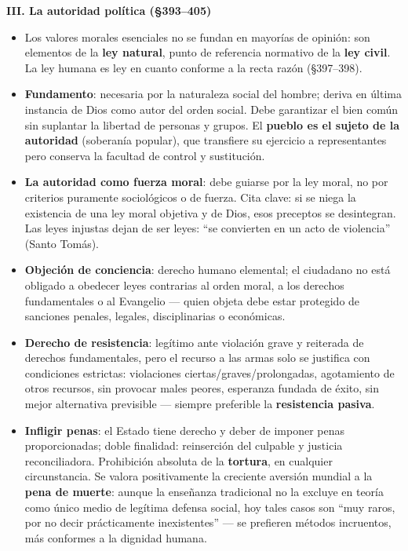 \documentclass[10pt,a4paper]{article}
\begin{document}
\medskip\noindent \textbf{III. La autoridad política (\S{}393--405)}\par\nopagebreak
\begin{itemize}
\item Los valores morales esenciales no se fundan en mayorías de opinión: son elementos de la \textbf{ley natural}, punto de referencia normativo de la \textbf{ley civil}. La ley humana es ley en cuanto conforme a la recta razón (\S{}397--398).
\item \textbf{Fundamento}: necesaria por la naturaleza social del hombre; deriva en última instancia de Dios como autor del orden social. Debe garantizar el bien común sin suplantar la libertad de personas y grupos. El \textbf{pueblo es el sujeto de la autoridad} (soberanía popular), que transfiere su ejercicio a representantes pero conserva la facultad de control y sustitución.
\item \textbf{La autoridad como fuerza moral}: debe guiarse por la ley moral, no por criterios puramente sociológicos o de fuerza. Cita clave: si se niega la existencia de una ley moral objetiva y de Dios, esos preceptos se desintegran. Las leyes injustas dejan de ser leyes: ``se convierten en un acto de violencia'' (Santo Tomás).
\item \textbf{Objeción de conciencia}: derecho humano elemental; el ciudadano no está obligado a obedecer leyes contrarias al orden moral, a los derechos fundamentales o al Evangelio --- quien objeta debe estar protegido de sanciones penales, legales, disciplinarias o económicas.
\item \textbf{Derecho de resistencia}: legítimo ante violación grave y reiterada de derechos fundamentales, pero el recurso a las armas solo se justifica con condiciones estrictas: violaciones ciertas/graves/prolongadas, agotamiento de otros recursos, sin provocar males peores, esperanza fundada de éxito, sin mejor alternativa previsible --- siempre preferible la \textbf{resistencia pasiva}.
\item \textbf{Infligir penas}: el Estado tiene derecho y deber de imponer penas proporcionadas; doble finalidad: reinserción del culpable y justicia reconciliadora. Prohibición absoluta de la \textbf{tortura}, en cualquier circunstancia. Se valora positivamente la creciente aversión mundial a la \textbf{pena de muerte}: aunque la enseñanza tradicional no la excluye en teoría como único medio de legítima defensa social, hoy tales casos son ``muy raros, por no decir prácticamente inexistentes'' --- se prefieren métodos incruentos, más conformes a la dignidad humana.
\end{itemize}
\end{document}
